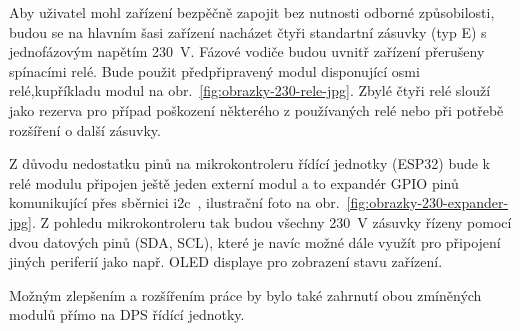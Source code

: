 Aby uživatel mohl zařízení bezpěčně zapojit bez nutnosti odborné způsobilosti, budou se na hlavním šasi zařízení nacházet čtyři standartní zásuvky (typ E) s jednofázovým napětím \qty{230}{V}. Fázové vodiče budou uvnitř zařízení přerušeny spínacími relé. Bude použit předpřipravený modul disponující osmi relé,kupříkladu modul na obr.~\ref{fig:obrazky-230-rele-jpg}. Zbylé čtyři relé slouží jako rezerva pro případ poškození některého z používaných relé nebo při potřebě rozšíření o další zásuvky. 

Z důvodu nedostatku pinů na mikrokontroleru řídící jednotky (ESP32) bude k relé modulu připojen ještě jeden externí modul a to expandér GPIO pinů komunikující přes sběrnici \acs{i2c}~\cite{eshop-laskakit-expander}, ilustrační foto na obr.~\ref{fig:obrazky-230-expander-jpg}. Z pohledu mikrokontroleru tak budou všechny \qty{230}{V} zásuvky řízeny pomocí dvou datových pinů (SDA, SCL), které je navíc možné dále využít pro připojení jiných periferií jako např. OLED displaye pro zobrazení stavu zařízení. 

Možným zlepšením a rozšířením práce by bylo také zahrnutí obou zmíněných modulů přímo na DPS řídící jednotky. 


